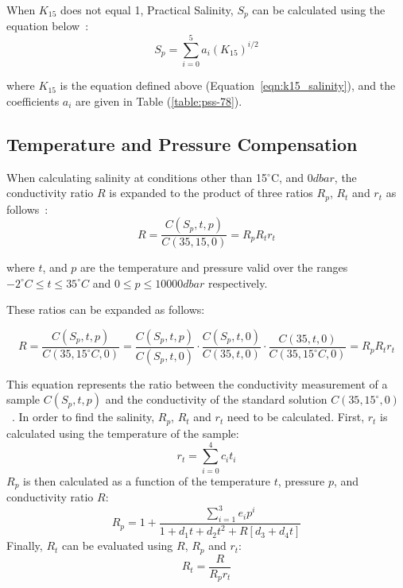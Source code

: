 When $K_{15}$ does not equal 1, Practical Salinity, $S_p$ can be calculated using the equation below~\cite{teos-10}: 
\begin{equation}\label{eqn:salinity_short}
    S_p = \sum_{i=0}^{5}a_i{(K_{15})}^{i/2} 
\end{equation}

where $K_{15}$ is the equation defined above (Equation~\ref{eqn:k15_salinity}), and the coefficients $a_i$ are given in Table (\ref{table:pss-78}).


\subsection{Temperature and Pressure Compensation}\label{sec:salinity_compensation}
When calculating salinity at conditions other than 15$^\circ$C, and $0dbar$, the conductivity ratio $R$ is expanded to the product of three ratios $R_p$, $R_t$ and $r_t$ as follows~\cite{teos-10}:
\begin{equation}
    R=\frac{C(S_p, t, p)}{C(35, 15, 0)} = R_p R_t r_t
\end{equation}

where $t$, and $p$ are the temperature and pressure valid over the ranges $-2^{\circ}C \leq t \leq 35^{\circ}C$ and $0 \leq p \leq 10 000dbar$ respectively.

These ratios can be expanded as follows:

\begin{equation}
    R = \frac{C(S_p, t, p)}{C(35, 15^{\circ} C, 0)} = \frac{C(S_p, t, p)}{C(S_p, t, 0)} \cdot \frac{C(S_p, t, 0)}{C(35, t, 0)} \cdot \frac{C(35, t, 0)}{C(35, 15^{\circ} C, 0)} = R_p R_t r_t
\end{equation}

This equation represents the ratio between the conductivity measurement of a sample $C(S_p,t,p)$ and the conductivity of the standard solution $C(35, 15^{\circ}, 0)$~\cite{teos-10}. 
In order to find the salinity, $R_p$, $R_t$ and $r_t$ need to be calculated.
First, $r_t$ is calculated using the temperature of the sample:
\begin{equation}
    r_t = \sum_{i=0}^{4} {c_i}{t_i}
\end{equation}
$R_p$ is then calculated as a function of the temperature $t$, pressure $p$, and conductivity ratio $R$:
\begin{equation}
    R_p = 1 + \frac{\sum_{i=1}^{3}{e_i}{p^i}}{1+d_1{t}+d_2{t^2}+R[d_3+d_4 {t}]}
\end{equation}
Finally, $R_t$ can be evaluated using $R$, $R_p$ and $r_t$:
\begin{equation}
    R_t = \frac{R}{{R_p}{r_t}}
\end{equation} 

